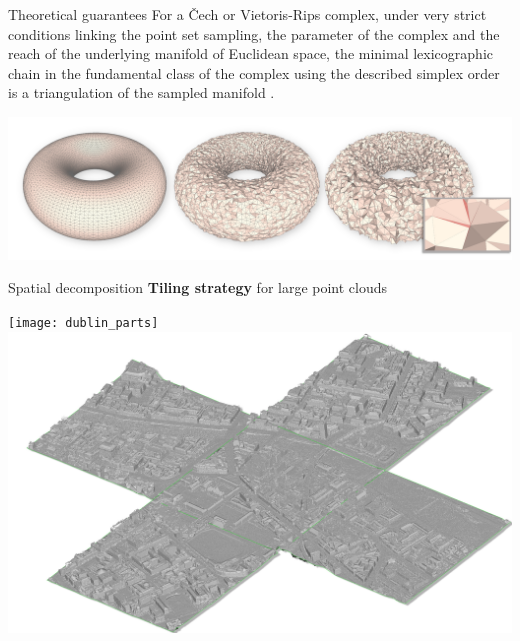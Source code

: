 \begin{frame}{Theoretical guarantees}
	\scriptsize
	For a Čech or Vietoris-Rips complex, under very strict conditions linking the point set sampling, the parameter of the complex and the reach of the underlying manifold of Euclidean space, the minimal lexicographic chain in the fundamental class of the complex using the described simplex order is a triangulation of the sampled manifold \cite{cohen-steiner_LexicographicOptimalChains_2019}.
	
	\includegraphics[width=\linewidth]{torus_3}	
\end{frame}

\begin{frame}{Spatial decomposition}
	\textbf{Tiling strategy} for large point clouds
	\begin{center}
		\texttt{[image: dublin\_parts]}
		\includegraphics[width=0.45\linewidth]{terrain_multipart}
	\end{center}
\end{frame}
